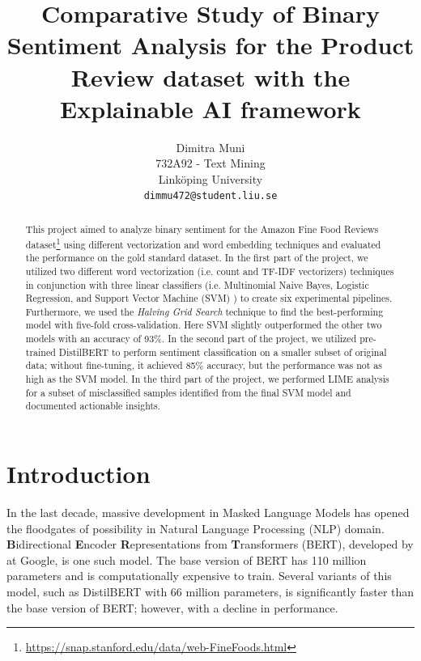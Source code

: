 \documentclass[11pt]{article}
\title{Comparative Study of Binary Sentiment Analysis for the Product Review dataset with the Explainable AI framework}
\author{Dimitra Muni\\
  732A92 - Text Mining \\
  Linköping University \\
  \texttt{dimmu472@student.liu.se}
  }
\begin{document}
\maketitle
\begin{abstract}
This project aimed to analyze binary sentiment for the Amazon Fine Food Reviews dataset\footnote{\url{https://snap.stanford.edu/data/web-FineFoods.html}} using different vectorization and word embedding techniques and evaluated the performance on the gold standard dataset. In the first part of the project, we utilized two different word vectorization (i.e. count  and TF-IDF vectorizers) techniques in conjunction with three linear classifiers (i.e. Multinomial Naive Bayes, Logistic Regression, and Support Vector Machine (SVM) ) to create six experimental pipelines. Furthermore, we used the \textit{Halving Grid Search} technique to find the best-performing model with five-fold cross-validation. Here SVM slightly outperformed the other two models with an accuracy of 93\%. In the second part of the project, we utilized pre-trained DistilBERT to perform sentiment classification on a smaller subset of original data; without fine-tuning, it achieved 85\% accuracy, but the performance was not as high as the SVM model. In the third part of the project, we performed LIME \cite{LIME} analysis for a subset of misclassified samples identified from the final SVM model and documented actionable insights.
\end{abstract}

\section{Introduction}
In the last decade, massive development in Masked Language Models has opened the floodgates of possibility in Natural Language Processing (NLP) domain. 
\textbf{B}idirectional \textbf{E}ncoder \textbf{R}epresentations from \textbf{T}ransformers (BERT), developed by \cite{BERT} at Google, is one such model. The base version of BERT has 110 million parameters and is computationally expensive to train. Several variants of this model, such as DistilBERT \cite{distilbert} with 66 million parameters, is significantly faster than the base version of BERT; however, with a decline in performance.
\end{document}
